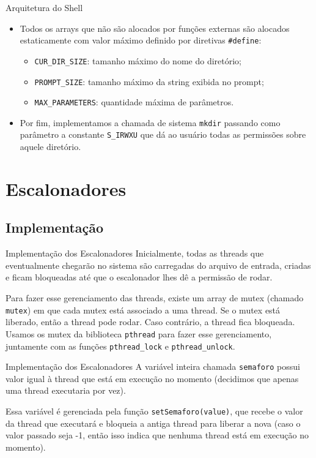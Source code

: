 \documentclass[10pt]{beamer}
\begin{document}
    \begin{frame}{Arquitetura do Shell}
      \begin{itemize}
        \justifying
        \item Todos os arrays que não são alocados por funções externas são alocados estaticamente com valor máximo definido por diretivas \texttt{\#define}:
        \begin{itemize}
          \vspace{-0.25in}
          \item \texttt{CUR\_DIR\_SIZE}: tamanho máximo do nome do diretório;
          \item \texttt{PROMPT\_SIZE}: tamanho máximo da string exibida no prompt;
          \item \texttt{MAX\_PARAMETERS}: quantidade máxima de parâmetros.
        \end{itemize}
        \item Por fim, implementamos a chamada de sistema \texttt{mkdir} passando como parâmetro a constante \texttt{S\_IRWXU} que dá ao usuário todas as permissões sobre aquele diretório.
      \end{itemize}
    \end{frame}
    \section{Escalonadores}
    \subsection{Implementação}
    \begin{frame}{Implementação dos Escalonadores}
    Inicialmente, todas as threads que eventualmente chegarão no sistema são carregadas do arquivo de entrada, criadas e ficam bloqueadas até que o escalonador lhes dê a permissão de rodar.

    Para fazer esse gerenciamento das threads, existe um array de mutex (chamado \texttt{mutex}) em
        que cada mutex está associado a uma thread. Se o mutex está liberado, então a thread pode
        rodar. Caso contrário, a thread fica bloqueada. Usamos os mutex da biblioteca
        \texttt{pthread} para fazer esse gerenciamento, juntamente com as funções \texttt{pthread\_lock} e \texttt{pthread\_unlock}.
    \end{frame}
    \begin{frame}{Implementação dos Escalonadores}
        A variável inteira chamada \texttt{semaforo} possui valor igual à thread que está em execução no momento (decidimos que apenas uma thread executaria por vez).

        Essa variável é gerenciada pela função \texttt{setSemaforo(value)},
        que recebe o valor da thread que executará e bloqueia a antiga
        thread para liberar a nova (caso o valor passado seja -1,
        então isso indica que nenhuma thread está em execução no momento).
    \end{frame}
\end{document}
